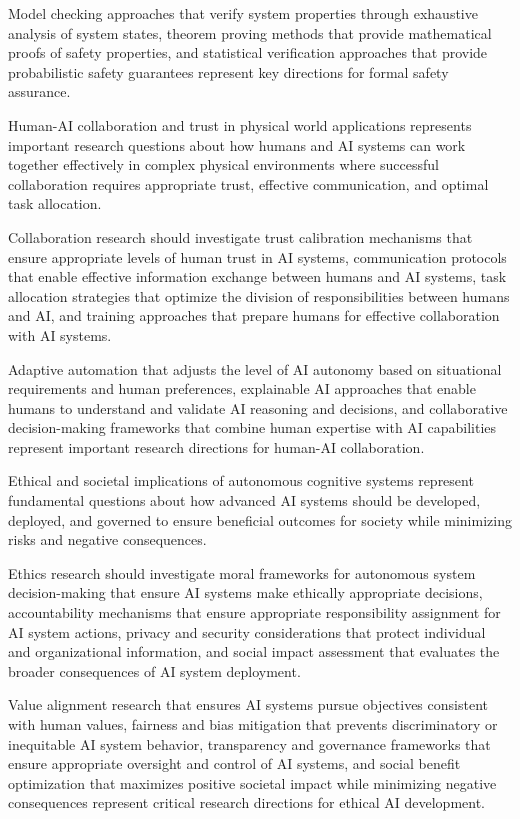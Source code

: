 Model checking approaches that verify system properties through exhaustive analysis of system states, theorem proving methods that provide mathematical proofs of safety properties, and statistical verification approaches that provide probabilistic safety guarantees represent key directions for formal safety assurance.

Human-AI collaboration and trust in physical world applications represents important research questions about how humans and AI systems can work together effectively in complex physical environments where successful collaboration requires appropriate trust, effective communication, and optimal task allocation.

Collaboration research should investigate trust calibration mechanisms that ensure appropriate levels of human trust in AI systems, communication protocols that enable effective information exchange between humans and AI systems, task allocation strategies that optimize the division of responsibilities between humans and AI, and training approaches that prepare humans for effective collaboration with AI systems.

Adaptive automation that adjusts the level of AI autonomy based on situational requirements and human preferences, explainable AI approaches that enable humans to understand and validate AI reasoning and decisions, and collaborative decision-making frameworks that combine human expertise with AI capabilities represent important research directions for human-AI collaboration.

Ethical and societal implications of autonomous cognitive systems represent fundamental questions about how advanced AI systems should be developed, deployed, and governed to ensure beneficial outcomes for society while minimizing risks and negative consequences.

Ethics research should investigate moral frameworks for autonomous system decision-making that ensure AI systems make ethically appropriate decisions, accountability mechanisms that ensure appropriate responsibility assignment for AI system actions, privacy and security considerations that protect individual and organizational information, and social impact assessment that evaluates the broader consequences of AI system deployment.

Value alignment research that ensures AI systems pursue objectives consistent with human values, fairness and bias mitigation that prevents discriminatory or inequitable AI system behavior, transparency and governance frameworks that ensure appropriate oversight and control of AI systems, and social benefit optimization that maximizes positive societal impact while minimizing negative consequences represent critical research directions for ethical AI development.

